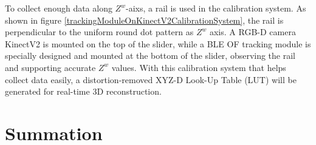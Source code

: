 %
\noindent
To collect enough data along \(Z^{w}\)-aixs, a rail is used in the calibration system. As shown in figure \ref{trackingModuleOnKinectV2CalibrationSystem}, the rail is perpendicular to the uniform round dot pattern as \(Z^{w}\) axis. A RGB-D camera KinectV2 is mounted on the top of the slider, while a BLE OF tracking module is specially designed and mounted at the bottom of the slider, observing the rail and supporting accurate \(Z^{w}\) values. With this calibration system that helps collect data easily, a distortion-removed XYZ-D Look-Up Table (LUT) will be generated for real-time 3D reconstruction.%

\section{Summation}

